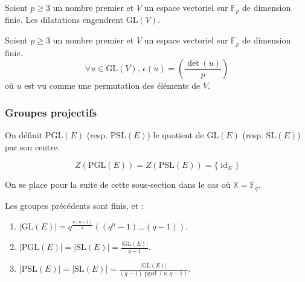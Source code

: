 	\begin{lemma}
		Soient $p \geq 3$ un nombre premier et $V$ un espace vectoriel sur $\mathbb{F}_p$ de dimension finie. Les dilatations engendrent $\mathrm{GL}(V)$.
	\end{lemma}


	\begin{application}
		Soient $p \geq 3$ un nombre premier et $V$ un espace vectoriel sur $\mathbb{F}_p$ de dimension finie.
		\[ \forall u \in \mathrm{GL}(V), \, \epsilon(u) = \left( \frac{\det(u)}{p} \right) \]
		où $u$ est vu comme une permutation des éléments de $V$.
	\end{application}

	\subsubsection{Groupes projectifs}


	\begin{definition}
		On définit $\mathrm{PGL}(E)$ (resp. $\mathrm{PSL}(E)$) le quotient de $\mathrm{GL}(E)$ (resp. $\mathrm{SL}(E)$) par son centre.
	\end{definition}

	\begin{proposition}
		\[ Z(\mathrm{PGL}(E)) = Z(\mathrm{PSL}(E)) = \{ \operatorname{id}_E \} \]
	\end{proposition}


	On se place pour la suite de cette sous-section dans le cas où $\mathbb{K} = \mathbb{F}_q$.

	\begin{proposition}
		Les groupes précédents sont finis, et :
		\begin{enumerate}[label=(\roman*)]
			\item $|\mathrm{GL}(E)| = q^{\frac{n(n-1)}{2}}((q^n-1) \dots (q-1))$.
			\item $|\mathrm{PGL}(E)| = |\mathrm{SL}(E)| = \frac{|\mathrm{GL}(E)|}{q-1}$.
			\item $|\mathrm{PSL}(E)| = |\mathrm{SL}(E)| = \frac{|\mathrm{GL}(E)|}{(q-1)\operatorname{pgcd}(n,q-1)}$.
		\end{enumerate}
	\end{proposition}


